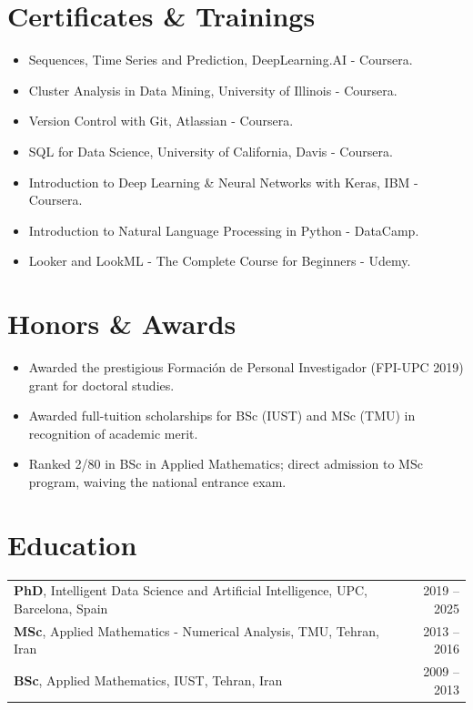\documentclass[11pt,a4paper]{article}
\begin{document}
\vspace{2mm}
\section{Certificates \& Trainings}
\begin{itemize}[leftmargin=*, nosep, topsep=2pt]
    \item Sequences, Time Series and Prediction, DeepLearning.AI - Coursera.
    \item Cluster Analysis in Data Mining, University of Illinois - Coursera.
    \item Version Control with Git, Atlassian - Coursera.
    \item SQL for Data Science, University of California, Davis - Coursera.
    \item Introduction to Deep Learning \& Neural Networks with Keras, IBM - Coursera.
    \item Introduction to Natural Language Processing in Python - DataCamp.
    \item Looker and LookML - The Complete Course for Beginners - Udemy.
\end{itemize}

\vspace{2mm}
\section{Honors \& Awards}
\begin{itemize}[leftmargin=*, nosep, topsep=2pt]
    \item Awarded the prestigious Formación de Personal Investigador (FPI-UPC 2019) grant for doctoral studies.
    \item Awarded full-tuition scholarships for BSc (IUST) and MSc (TMU) in recognition of academic merit.
    \item Ranked 2/80 in BSc in Applied Mathematics; direct admission to MSc program, waiving the national entrance exam.
\end{itemize}

\vspace{2mm}
\section{Education}
\begin{tabularx}{\textwidth}{@{}X r@{}}
\textbf{PhD}, Intelligent Data Science and Artificial Intelligence, UPC, Barcelona, Spain & 2019 -- 2025 \\
\textbf{MSc}, Applied Mathematics - Numerical Analysis, TMU, Tehran, Iran & 2013 -- 2016 \\
\textbf{BSc}, Applied Mathematics, IUST, Tehran, Iran & 2009 -- 2013 \\
\end{tabularx}
\end{document}
